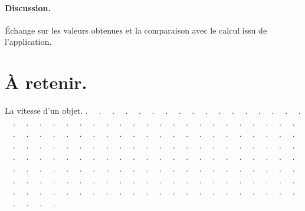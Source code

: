 \documentclass[12pt,a4paper,notitlepage]{article}
\begin{document}
\paragraph{Discussion.} Échange sur les valeurs obtenues et la comparaison avec le calcul issu de l'application.

\section{À retenir.}
\begin{bclogo}[couleur=pink!5, epOmbre=0.2cm, arrondi=0.1, logo=\bccoeur, nobreak=true]{La vitesse d'un objet.}
\noindent . \ \ . \ \ . \ \ . \ \ . \ \ . \ \ . \ \ . \ \ . \ \ . \ \ . \ \ . \ \ . \ \ . \ \ . \ \ . \ \ . \ \ . \ \ . \ \ . \ \ . \ \ . \ \ . \ \ . \ \ . \ \ . \ \ . \ \ . \ \ . \ \ . \ \ . \ \ . \ \ . \ \ . \ \ . \ \ . \ \ . \ \ . \ \ . \ \ . \ \ . \ \ . \ \ . \ \ . \ \ . \ \ . \ \ . \ \ . \ \ . \ \ . \ \ . \ \ . \ \ . \ \ . \ \ . \ \ . \ \ . \ \ . \ \ . \ \ . \ \ . \ \ . \ \ . \ \ . \ \ . \ \ . \ \ . \ \ . \ \ . \ \ . \ \ . \ \ . \ \ . \ \ . \ \ . \ \ . \ \ . \ \ . \ \ . \ \ . \ \ . \ \ . \ \ . \ \ . \ \ . \ \ . \ \ . \ \ . \ \ . \ \ . \ \ . \ \ . \ \ . \ \ . \ \ . \ \ . \ \ . \ \ . \ \ . \ \ . \ \ . \ \ . \ \ . \ \ . \ \ . \ \ . \ \ . \ \ . \ \ . \ \ . \ \ . \ \ . \ \ . \ \ . \ \ . \ \ . \ \ . \ \ . \ \ . \ \ . \ \ . \ \ . \ \ . \ \ . \ \ . \ \ . \ \ . \ \ . \ \ . \ \ . \ \ . \ \ . \ \ . \ \ . \ \ . \ \ . \ \ . \ \ . \ \ . \ \ . \ \ . \ \ . \ \ . \ \ . \ \ . \ \ . \ \ . \ \ . \ \ . \ \ . \ \ . \ \ . \ \ . \ \ . \ \ . \ \ . \ \ . \ \ . \ \ . \ \ . \ \ . \ \ . \ \ . \ \ . \ \ . \ \ . \ \ . \ \ . \ \ . \ \ . \ \ . \ \ . \ \ . \ \ . \ \ .
\end{bclogo}
\end{document}
